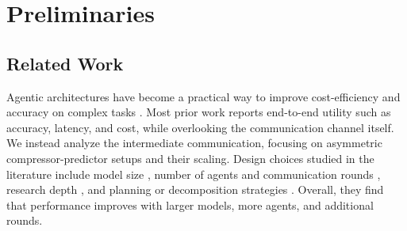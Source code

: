 \documentclass{article} %
\begin{document}

\section{Preliminaries}
\label{sec:preliminaries}

\subsection{Related Work}
\label{sec:related-work}

Agentic architectures have become a practical way to improve cost-efficiency and accuracy on complex tasks \citep{du2025deepresearch, narayan2025minions}. Most prior work reports end-to-end utility such as accuracy, latency, and cost, while overlooking the communication channel itself. We instead analyze the intermediate communication, focusing on asymmetric compressor-predictor setups and their scaling. Design choices studied in the literature include model size \citep{narayan2025minions, wang2024mixture}, number of agents and communication rounds \citep{chen2024more, schluntz2025building}, research depth \citep{zhang2025web}, and planning or decomposition strategies \citep{saad2024archon, erdogan2025plan}. Overall, they find that performance improves with larger models, more agents, and additional rounds.
\end{document}
